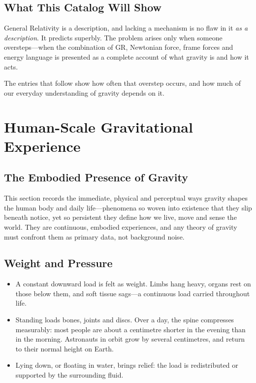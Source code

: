 \documentclass[11pt,a4paper]{article}
\begin{document}
\subsection{What This Catalog Will Show}

General Relativity is a description, and lacking a mechanism is no flaw in it \emph{as a description}. It predicts superbly. The problem arises only when someone oversteps---when the combination of GR, Newtonian force, frame forces and energy language is presented as a complete account of what gravity is and how it acts.

The entries that follow show how often that overstep occurs, and how much of our everyday understanding of gravity depends on it.

\section{Human-Scale Gravitational Experience}

\subsection{The Embodied Presence of Gravity}

This section records the immediate, physical and perceptual ways gravity shapes the human body and daily life---phenomena so woven into existence that they slip beneath notice, yet so persistent they define how we live, move and sense the world. They are continuous, embodied experiences, and any theory of gravity must confront them as primary data, not background noise.

\subsection{Weight and Pressure}

\begin{itemize}
  \item A constant downward load is felt as weight. Limbs hang heavy, organs rest on those below them, and soft tissue sags---a continuous load carried throughout life.
  \item Standing loads bones, joints and discs. Over a day, the spine compresses measurably: most people are about a centimetre shorter in the evening than in the morning. Astronauts in orbit grow by several centimetres, and return to their normal height on Earth.
  \item Lying down, or floating in water, brings relief: the load is redistributed or supported by the surrounding fluid.
\end{itemize}
\end{document}
